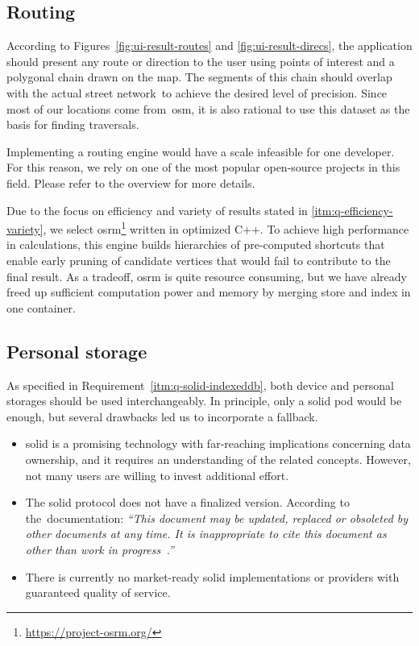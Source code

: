 \subsection{Routing}\label{ssec:design-routing}

According to Figures~\ref{fig:ui-result-routes} and \ref{fig:ui-result-direcs}, the application should present any route or direction to the user using points of interest and a polygonal chain drawn on the map. The segments of this chain should overlap with the actual street network~to achieve the desired level of precision. Since most of our locations come from~\acs{osm}, it is also rational to use this dataset as the basis for finding traversals.

Implementing a routing engine would have a scale infeasible for one developer. For this reason, we rely on one of the most popular open-source projects in this field. Please refer to the overview \cite{nolde20} for more details.

Due to the focus on efficiency and variety of results stated in \ref{itm:q-efficiency-variety}, we select \ac{osrm}\footnote{\href{https://project-osrm.org/}{https://project-osrm.org/}} written in optimized C++. To achieve high performance in calculations, this engine builds hierarchies of pre-computed shortcuts that enable early pruning of candidate vertices that would fail to contribute to the final result. As a tradeoff, \acs{osrm} is quite resource consuming, but we have already freed up sufficient computation power and memory by merging store and index in one container.

\subsection{Personal storage}\label{ssec:personal-storage}

As specified in Requirement~\ref{itm:q-solid-indexeddb}, both device and personal storages should be used interchangeably. In principle, only a \acs{solid} pod would be enough, but several drawbacks led us to incorporate a fallback.

\begin{itemize}
\item \acs{solid} is a promising technology with far-reaching implications concerning data ownership, and it requires an understanding of the related concepts. However, not many users are willing to invest additional effort.
\item The \acs{solid} protocol does not have a finalized version. According to the~doc\-u\-men\-ta\-tion: \emph{``This document may be updated, replaced or obsoleted by other documents at any time. It is inappropriate to cite this document as other than work in progress~\cite{solid22}.''}
\item There is currently no market-ready \acs{solid} implementations or providers with guaranteed quality of service.
\end{itemize}


